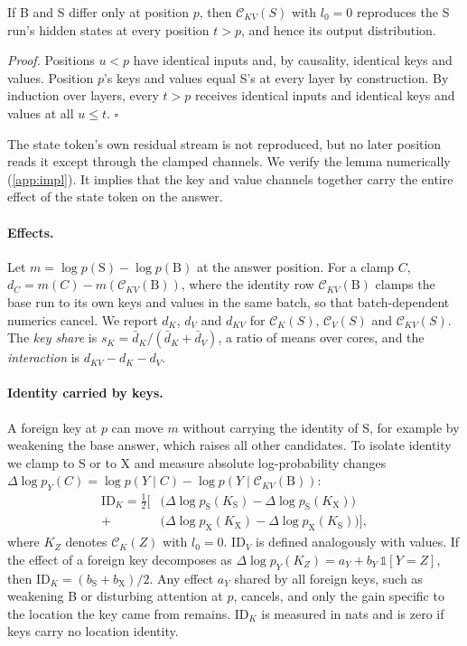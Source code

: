 \begin{lemma}[Exactness]\label{lem:exact}
If B and S differ only at position $p$, then $\mathcal{C}_{KV}(S)$ with $l_0 = 0$ reproduces the S run's hidden states at every position $t > p$, and hence its output distribution.
\end{lemma}
\emph{Proof.} Positions $u < p$ have identical inputs and, by causality, identical keys and values. Position $p$'s keys and values equal S's at every layer by construction. By induction over layers, every $t > p$ receives identical inputs and identical keys and values at all $u \le t$. \hfill$\square$

The state token's own residual stream is not reproduced, but no later position reads it except through the clamped channels. We verify the lemma numerically (\cref{app:impl}). It implies that the key and value channels together carry the entire effect of the state token on the answer.

\paragraph{Effects.} Let $m = \log p(\mathrm{S}) - \log p(\mathrm{B})$ at the answer position. For a clamp $C$, $d_C = m(C) - m(\mathcal{C}_{KV}(\mathrm{B}))$, where the identity row $\mathcal{C}_{KV}(\mathrm{B})$ clamps the base run to its own keys and values in the same batch, so that batch-dependent numerics cancel. We report $d_K$, $d_V$ and $d_{KV}$ for $\mathcal{C}_K(S)$, $\mathcal{C}_V(S)$ and $\mathcal{C}_{KV}(S)$. The \emph{key share} is $s_K = \bar d_K / (\bar d_K + \bar d_V)$, a ratio of means over cores, and the \emph{interaction} is $d_{KV} - d_K - d_V$.

\paragraph{Identity carried by keys.} A foreign key at $p$ can move $m$ without carrying the identity of S, for example by weakening the base answer, which raises all other candidates. To isolate identity we clamp to S or to X and measure absolute log-probability changes $\Delta\!\log p_Y(C) = \log p(Y \mid C) - \log p(Y \mid \mathcal{C}_{KV}(\mathrm{B}))$:
\begin{equation}\label{eq:idk}
\begin{split}
\mathrm{ID}_K = \tfrac{1}{2}\Big[ &\big(\Delta\!\log p_{\mathrm{S}}(K_{\mathrm{S}}) - \Delta\!\log p_{\mathrm{S}}(K_{\mathrm{X}})\big) \\
 + &\big(\Delta\!\log p_{\mathrm{X}}(K_{\mathrm{X}}) - \Delta\!\log p_{\mathrm{X}}(K_{\mathrm{S}})\big)\Big],
\end{split}
\end{equation}
where $K_Z$ denotes $\mathcal{C}_K(Z)$ with $l_0 = 0$. $\mathrm{ID}_V$ is defined analogously with values. If the effect of a foreign key decomposes as $\Delta\!\log p_Y(K_Z) = a_Y + b_Y\,\mathbb{1}[Y = Z]$, then $\mathrm{ID}_K = (b_{\mathrm{S}} + b_{\mathrm{X}})/2$. Any effect $a_Y$ shared by all foreign keys, such as weakening B or disturbing attention at $p$, cancels, and only the gain specific to the location the key came from remains. $\mathrm{ID}_K$ is measured in nats and is zero if keys carry no location identity.

